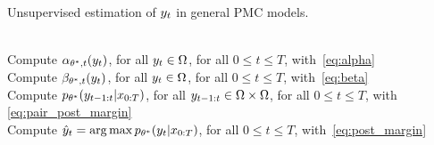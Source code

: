 \begin{algorithm}[htbp!]
  \caption{Unsupervised estimation of $y_t$ in general PMC models.}
  \label{algo:algo_hk_pmc}
  \begin{algorithmic}[1]
  \\
  Compute $\alpha_{\theta^{*},t}(y_t)$, for all $y_t \in \Omega$, for all $0 \leq t \leq T$, with~\eqref{eq:alpha}\\
  Compute $\beta_{\theta^{*},t}(y_t)$, for all $y_t \in \Omega$, for all $0 \leq t \leq T$, with~\eqref{eq:beta}\\
  Compute $p_{\theta^{*}}(y_{t-1:t}|x_{0:T})$, for all $y_{t-1:t} \in \Omega \times \Omega$, for all $0 \leq t \leq T$, with \eqref{eq:pair_post_margin}\\
  Compute $\hat{y}_t= \operatorname*{arg\,max} p_{\theta^{*}}(y_t|x_{0:T})$, for all $0 \leq t \leq T$, with~\eqref{eq:post_margin}\label{line:end_dpmc}  
  \end{algorithmic}
\end{algorithm}


